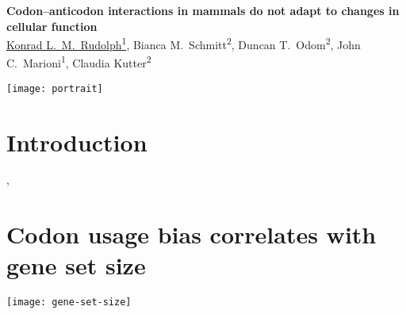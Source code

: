 \documentclass[a0,portrait]{a0poster}
\begin{document}
\sffamily

\noindent
\begin{minipage}[][10cm][t]{0.88\textwidth}
    {
        \VeryHuge\color{accent}\bfseries\sffamily%
        Codon–anticodon interactions in mammals do not adapt to changes in
        cellular function
    }
    {
        \\[\baselineskip]
        \noindent
        \Large\color{Black}%
        \underline{Konrad L.\ M.\ Rudolph\textsuperscript{1}},
        Bianca M.\ Schmitt\textsuperscript{2},
        Duncan T.\ Odom\textsuperscript{2},
        John C.\ Marioni\textsuperscript{1},
        Claudia Kutter\textsuperscript{2}
    }
\end{minipage}%
\hfill%
\begin{minipage}[][10cm][t]{0.1\textwidth}
    \raggedleft
    \texttt{[image: portrait]}
\end{minipage}

\vspace{3cm}
\Large

\noindent
\begin{minipage}[t][][t]{0.45\textwidth}
    \section*{Introduction}
    \blindtext
    \citep{Schmitt:2014}, \citep{Gingold:2014}
\end{minipage}%
\hfill%
\begin{minipage}[t][][t]{0.5\textwidth}
    \section*{Codon usage bias correlates with gene set size}
    \texttt{[image: gene-set-size]}
\end{minipage}
\end{document}
